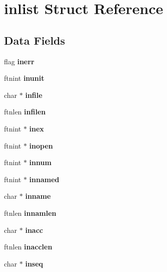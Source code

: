 \section{inlist \-Struct \-Reference}
\label{structinlist}
\subsection*{\-Data \-Fields}
\begin{DoxyCompactItemize}
\item 
flag {\bfseries inerr}\label{structinlist_a58bf72b64fab5d27aa0f7ef878d5c8d2}

\item 
ftnint {\bfseries inunit}\label{structinlist_a69244da0365f1012d4ed89d569c7e687}

\item 
char $\ast$ {\bfseries infile}\label{structinlist_a335023ababe7eb52a89577de0a1f155c}

\item 
ftnlen {\bfseries infilen}\label{structinlist_a09d868ed15261e31dfe2d6471d3f73e1}

\item 
ftnint $\ast$ {\bfseries inex}\label{structinlist_a6266bd70b0f26d29d084e9e159cf7907}

\item 
ftnint $\ast$ {\bfseries inopen}\label{structinlist_a791dfdf3cc38883912c17f44dfbbb2af}

\item 
ftnint $\ast$ {\bfseries innum}\label{structinlist_a0827d903d61f0f02e48414de0893e7a9}

\item 
ftnint $\ast$ {\bfseries innamed}\label{structinlist_a020090cdbc0134b62d96dee447ded084}

\item 
char $\ast$ {\bfseries inname}\label{structinlist_ac34ac359c5711418bc7a0fe50bc017e5}

\item 
ftnlen {\bfseries innamlen}\label{structinlist_ae975e40f5e868451a31221c7cfe4da4e}

\item 
char $\ast$ {\bfseries inacc}\label{structinlist_aa4fb66e031aa3c7c4d8659145091ff6b}

\item 
ftnlen {\bfseries inacclen}\label{structinlist_a78dde025010d1d60468984985467e5a5}

\item 
char $\ast$ {\bfseries inseq}\label{structinlist_a31bfcb7364ef9a1fd38262997247ca67}


\end{DoxyCompactItemize}
